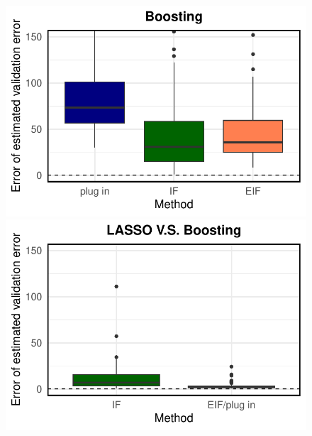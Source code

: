 \begin{figure}[ht]
\begin{minipage}{0.3\textwidth}
                \includegraphics[clip, trim = 0cm 0cm 0cm 0cm, width = \textwidth]{plot/ACIC_linear_propensity_nonlinear_HTE_estimator_error_Boosting.pdf}
        \end{minipage}
        \begin{minipage}{0.3\textwidth}
                \centering
                \includegraphics[clip, trim = 0cm 0cm 0cm 0cm, width = \textwidth]{plot/ACIC_linear_propensity_nonlinear_HTE_estimator_error_LASSO_V.S._Boosting.pdf}
        \end{minipage}        
          \\
        \begin{minipage}{0.3\textwidth}
                \centering

\end{minipage}
\end{figure}
